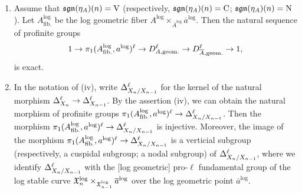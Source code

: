\begin{prop}
\begin{enumerate}
\begin{center}
    \end{center}
    where $\GPRFG{\ell}{A}$ is the geometrically pro-$\ell$ fundamental group of $A$. Then all the horizontal sequences in the diagram are exact.
    \item Assume that $\mathfrak{sgn}(\eta_A)(n) = \mathrm{V}$ (respectively, $\mathfrak{sgn}(\eta_A)(n) = \mathrm{C}$; $\mathfrak{sgn}(\eta_A)(n) = \mathrm{N}$). Let $A_\text{fib.}^\log$ be the log geometric fiber $A^\log \times_{\overline{A}^\log} \overline{a}^\log$. Then the natural sequence of profinite groups
    \[
      1 \to \pi_1(A_\text{fib.}^{\mathrm{log}}, a^{\mathrm{log}})^\ell \to D^{\ell}_{A, \text{geom.}} \to D^{\ell}_{\overline{A}, \text{geom.}} \to 1,
    \]
    is exact.
    \item In the notation of (iv), write $\Delta_{X_n/X_{n - 1}}^\ell$ for the kernel of the natural morphism $\Delta_{X_n}^\ell \to \Delta_{X_{n - 1}}^\ell$. By the assertion (iv), we can obtain the natural morphism of profinite groups $\pi_1(A_\text{fib.}^{\mathrm{log}}, a^{\mathrm{log}})^\ell \to \Delta_{X_n/X_{n - 1}}^\ell$. Then the morphism $\pi_1(A_\text{fib.}^{\mathrm{log}}, a^{\mathrm{log}})^\ell \to \Delta_{X_n/X_{n - 1}}^\ell$ is injective. Moreover, the image of the morphism $\pi_1(A_\text{fib.}^{\mathrm{log}}, a^{\mathrm{log}})^\ell \to \Delta_{X_n/X_{n - 1}}^\ell$ is a verticial subgroup (respectively, a cuspidal subgroup; a nodal subgroup) of $\Delta_{X_n/X_{n - 1}}^\ell$, where we identify $\Delta_{X_n/X_{n - 1}}^\ell$ with the [log geometric] pro-$\ell$ fundamental group of the log stable curve $\mathfrak{X}^{\mathrm{log}}_n \times_{\mathfrak{X}^{\mathrm{log}}_{n - 1}} \overline{a}^{\mathrm{log}}$ over the log geometric point $\overline{a}^\log$.

\end{enumerate}
\end{prop}
